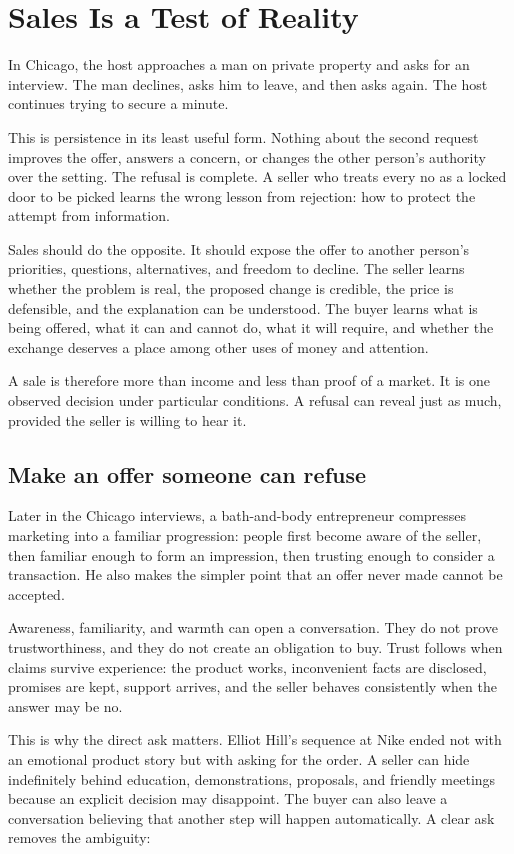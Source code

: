 \chapter{Sales Is a Test of Reality}

In Chicago, the host approaches a man on private property and asks for an
interview. The man declines, asks him to leave, and then asks again. The host
continues trying to secure a minute.

This is persistence in its least useful form. Nothing about the second request
improves the offer, answers a concern, or changes the other person's authority
over the setting. The refusal is complete. A seller who treats every no as a
locked door to be picked learns the wrong lesson from rejection: how to protect
the attempt from information.

Sales should do the opposite. It should expose the offer to another person's
priorities, questions, alternatives, and freedom to decline. The seller learns
whether the problem is real, the proposed change is credible, the price is
defensible, and the explanation can be understood. The buyer learns what is
being offered, what it can and cannot do, what it will require, and whether the
exchange deserves a place among other uses of money and attention.

A sale is therefore more than income and less than proof of a market. It is one
observed decision under particular conditions. A refusal can reveal just as
much, provided the seller is willing to hear it.

\section{Make an offer someone can refuse}

Later in the Chicago interviews, a bath-and-body entrepreneur compresses
marketing into a familiar progression: people first become aware of the
seller, then familiar enough to form an impression, then trusting enough to
consider a transaction. He also makes the simpler point that an offer never
made cannot be accepted.

Awareness, familiarity, and warmth can open a conversation. They do not prove
trustworthiness, and they do not create an obligation to buy. Trust follows
when claims survive experience: the product works, inconvenient facts are
disclosed, promises are kept, support arrives, and the seller behaves
consistently when the answer may be no.

This is why the direct ask matters. Elliot Hill's sequence at Nike ended not
with an emotional product story but with asking for the order. A seller can
hide indefinitely behind education, demonstrations, proposals, and friendly
meetings because an explicit decision may disappoint. The buyer can also leave
a conversation believing that another step will happen automatically. A clear
ask removes the ambiguity:

